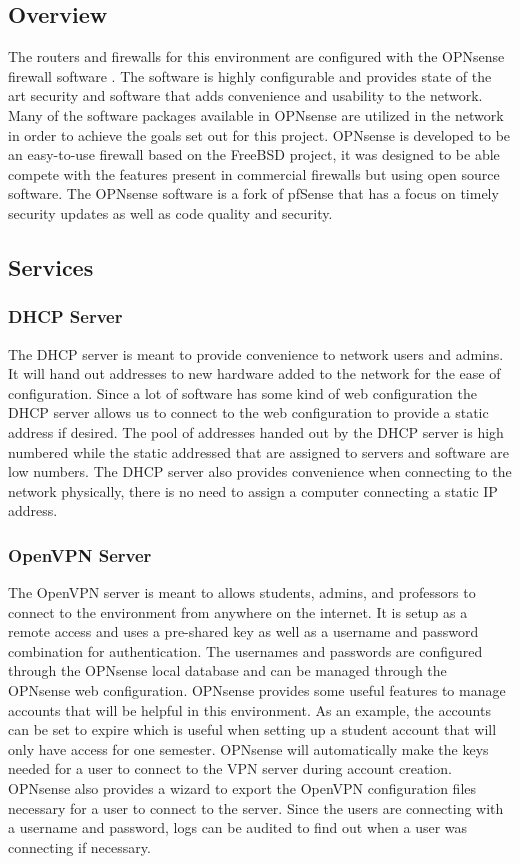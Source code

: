 \documentclass[12pt]{IEEEtran}
\begin{document}
\subsection{Overview}
The routers and firewalls for this environment are configured with the OPNsense firewall software \cite{opnsense}.
The software is highly configurable and provides state of the art security and software that adds convenience and usability to the network.
Many of the software packages available in OPNsense are utilized in the network in order to achieve the goals set out for this project.
OPNsense is developed to be an easy-to-use firewall based on the FreeBSD project, it was designed to be able compete with the features present in commercial firewalls but using open source software.
The OPNsense software is a fork of pfSense\cite{pfsense} that has a focus on timely security updates as well as code quality and security\cite{opnsenseabout}. 

\subsection{Services}
\subsubsection{DHCP Server}
The DHCP server is meant to provide convenience to network users and admins.
It will hand out addresses to new hardware added to the network for the ease of configuration. 
Since a lot of software has some kind of web configuration the DHCP server allows us to connect to the web configuration to provide a static address if desired. 
The pool of addresses handed out by the DHCP server is high numbered while the static addressed that are assigned to servers and software are low numbers. 
The DHCP server also provides convenience when connecting to the network physically, there is no need to assign a computer connecting a static IP address. 

\subsubsection{OpenVPN Server}
The OpenVPN server is meant to allows students, admins, and professors to connect to the environment from anywhere on the internet. 
It is setup as a remote access and uses a pre-shared key as well as a username and password combination for authentication.
The usernames and passwords are configured through the OPNsense local database and can be managed through the OPNsense web configuration.
OPNsense provides some useful features to manage accounts that will be helpful in this environment.
As an example, the accounts can be set to expire which is useful when setting up a student account that will only have access for one semester. 
OPNsense will automatically make the keys needed for a user to connect to the VPN server during account creation. 
OPNsense also provides a wizard to export the OpenVPN configuration files necessary for a user to connect to the server. 
Since the users are connecting with a username and password, logs can be audited to find out when a user was connecting if necessary. 
\end{document}
